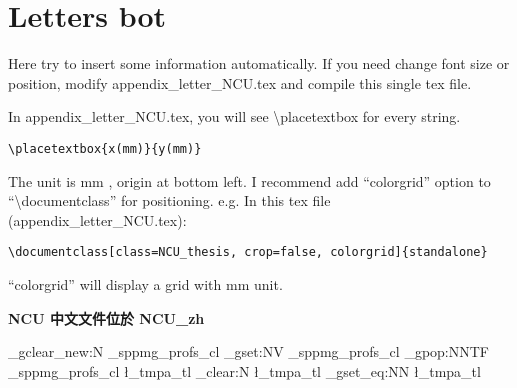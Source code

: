 \documentclass[class=NCU_thesis, crop=false]{standalone}
\begin{document}
\chapter{Letters bot}

Here try to insert some information automatically.
If you need change font size or position, modify appendix\_letter\_NCU.tex and compile this single tex file.

In appendix\_letter\_NCU.tex, you will see \textbackslash{}placetextbox for every string.
\begin{lstlisting}[style=LatexStyle,caption={}]
\placetextbox{x(mm)}{y(mm)}
\end{lstlisting}

The unit is mm , origin at bottom left. I recommend add ``colorgrid'' option to ``\textbackslash{}documentclass'' for positioning. e.g. In this tex file (appendix\_letter\_NCU.tex):

\begin{lstlisting}[style=LatexStyle,caption={}]
\documentclass[class=NCU_thesis, crop=false, colorgrid]{standalone}
\end{lstlisting}

``colorgrid'' will display a grid with mm unit. 

\begin{center}
{ \noindent\color{red}\bfseries\Large NCU 中文文件位於 NCU\_zh}
\end{center}

\ExplSyntaxOn
    \clist_gclear_new:N \g_sppmg_profs_cl
    \clist_gset:NV \g_sppmg_profs_cl \profs
    \clist_gpop:NNTF \g_sppmg_profs_cl \l_tmpa_tl {}{ \tl_clear:N \l_tmpa_tl}
    \cs_gset_eq:NN \mprof \l_tmpa_tl
\ExplSyntaxOff

\def\title{\titleEn}

\cleardoublepage
\pagestyle{empty}
\sffamily


\end{document}
